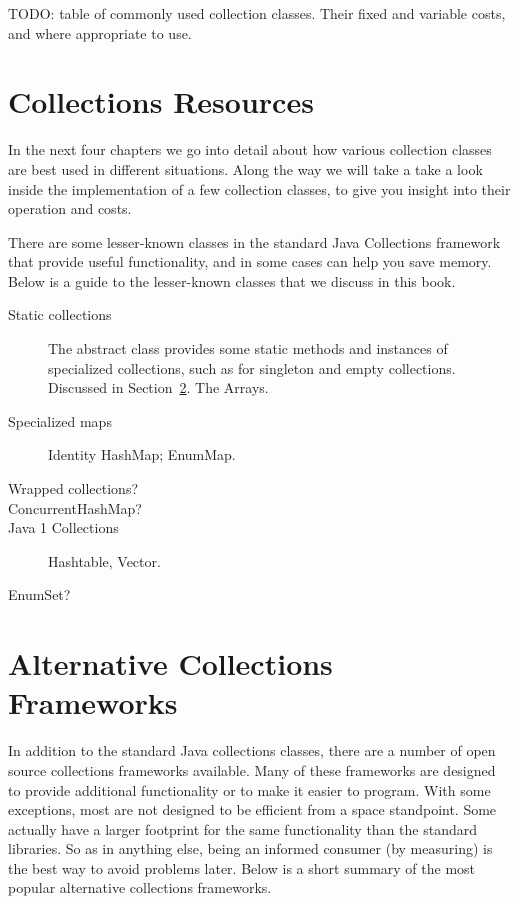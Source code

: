 TODO: table of commonly used collection classes. Their fixed and variable
costs, and where appropriate to use. 

\section{Collections Resources}

In the next four chapters we go into detail about how various
collection classes are best used in different situations. Along the way we will take a
take a look inside the implementation of a few collection classes, to give you
insight into their operation and costs.

There are some lesser-known classes in the standard Java
Collections framework that provide
useful functionality, and in some cases can help you save memory. Below is
a guide to the lesser-known classes that we discuss in this book.

\begin{description}
\item[Static collections] The abstract class 
provides some static methods and instances of specialized collections, such as
for singleton and empty collections.  Discussed in Section~\ref{}.  The 
Arrays.
\item[Specialized maps] Identity HashMap; EnumMap.
\item[Wrapped collections?]
\item[ConcurrentHashMap?]
\item[Java 1 Collections] Hashtable, Vector.
\item[EnumSet?]
\end{description}


\section{Alternative Collections Frameworks}
In addition to the standard Java collections classes, there are a number of
open source collections frameworks available. Many of these frameworks
are designed to provide additional functionality or to make it easier to
program. With some exceptions, most are not designed to be efficient from a
space standpoint. Some actually have a
larger footprint for the same functionality than the standard libraries. So as
in anything else, being an informed consumer (by measuring) is the best way to
avoid problems later. Below is a short summary of the most
popular alternative collections frameworks.

